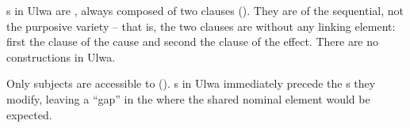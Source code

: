 s in Ulwa are , always composed of two clauses (). They are of the  sequential, not the  purposive variety -- that is, the two clauses are  without any linking element: first the clause of the cause and second the clause of the effect. There are no   constructions in Ulwa.

Only subjects are accessible to  (). s in Ulwa immediately precede the s they modify, leaving a  “gap” in the  where the shared nominal element would be expected.

